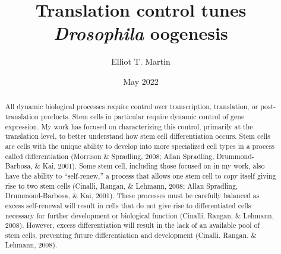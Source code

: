 \documentclass[12pt,oneside]{reedthesis}
\title{Translation control tunes \emph{Drosophila} oogenesis}
\author{Elliot T. Martin}
\date{May 2022}
\begin{document}
  \maketitle

\frontmatter %
\pagestyle{plain} %
  \begin{abstract}
  \setcounter{page}{2}
  \pagestyle{plain}

    \par

    All dynamic biological processes require control over transcription, translation, or post-translation products. Stem cells in particular require dynamic control of gene expression. My work has focused on characterizing this control, primarily at the translation level, to better understand how stem cell differentiation occurs. Stem cells are cells with the unique ability to develop into more specialized cell types in a process called differentiation (Morrison \& Spradling, 2008; Allan Spradling, Drummond-Barbosa, \& Kai, 2001). Some stem cell, including those focused on in my work, also have the ability to ``self-renew,'' a process that allows one stem cell to copy itself giving rise to two stem cells (Cinalli, Rangan, \& Lehmann, 2008; Allan Spradling, Drummond-Barbosa, \& Kai, 2001). These processes must be carefully balanced as excess self-renewal will result in cells that do not give rise to differentiated cells necessary for further development or biological function (Cinalli, Rangan, \& Lehmann, 2008). However, excess differentiation will result in the lack of an available pool of stem cells, preventing future differentiation and development (Cinalli, Rangan, \& Lehmann, 2008).

    \par


\end{abstract}
\end{document}
